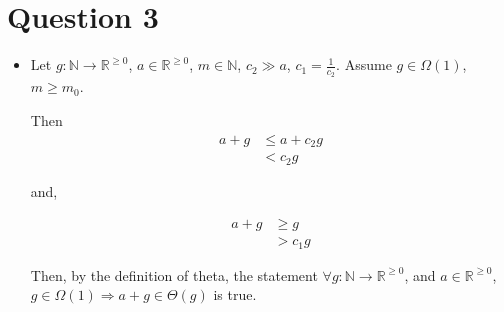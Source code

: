 \documentclass[12pt]{article}
\begin{document}
\section*{Question 3}
\begin{itemize}
    \item

    Let $g: \mathbb{N} \to \mathbb{R}^{\geq 0}$, $a \in \mathbb{R}^{\geq 0}$,
    $m \in \mathbb{N}$, $c_2 \gg a$, $c_1 = \frac{1}{c_2}$. Assume $g \in \Omega (1)$,
    $m \geq m_0$.

    \bigskip

    Then
    \setcounter{equation}{0}
    \begin{align}
        a + g &\leq a + c_2 g\\
        &< c_2 g
    \end{align}

    and,

    \begin{align}
        a + g &\geq g\\
        &> c_1 g
    \end{align}

    \bigskip

    Then, by the definition of theta, the statement $\forall g: \mathbb{N} \to
    \mathbb{R}^{\geq 0}$, and $a \in \mathbb{R}^{\geq 0}$, $g \in \Omega(1)
    \Rightarrow a + g \in \Theta(g)$ is true.

\end{itemize}
\end{document}
